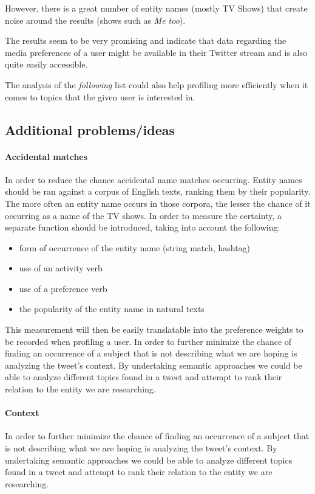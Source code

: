 However, there is a great number of entity names (mostly TV Shows) that create noise around the results (shows such as \textit{Me too}).

The results seem to be very promising and indicate that data regarding the media preferences of a user might
be available in their Twitter stream and is also quite easily accessible.

The analysis of the \textit{following} list could also help profiling more efficiently when it comes to topics that the
given user is interested in.

\subsection{Additional problems/ideas}
\paragraph{Accidental matches}
In order to reduce the chance accidental name matches occurring. Entity names should be ran against a corpus of English texts,
ranking them by their popularity. The more often an entity name occurs in those corpora, the lesser the chance of it occurring
as a name of the TV shows. In order to measure the certainty, a separate function should be introduced, taking into account the following:

\begin{itemize}
  \item form of occurrence of the entity name (string match, hashtag)
  \item use of an activity verb
  \item use of a preference verb
  \item the popularity of the entity name in natural texts
\end{itemize}

This measurement will then be easily translatable into the preference weights to be recorded when profiling a user.
In order to further minimize the chance of finding an occurrence of a subject that is not describing what we are hoping is analyzing the tweet's context.
By undertaking semantic approaches we could be able to analyze different topics found in a tweet and attempt to rank their relation to the entity we are researching.

\paragraph{Context}
In order to further minimize the chance of finding an occurrence of a subject that is not describing what we are hoping is analyzing the tweet's context.
By undertaking semantic approaches we could be able to analyze different topics found in a tweet and attempt to rank their relation to the entity we are researching.

